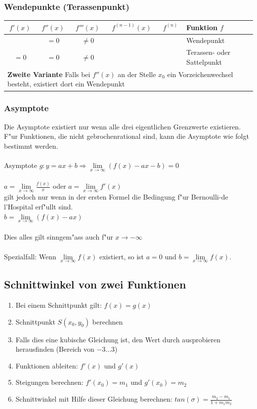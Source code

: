 \subsubsection{Wendepunkte (Terassenpunkt)}
\begin{tabular}{|c|c|c|c|c|l|}
	\hline $f'(x)$ & $f''(x)$ & $f'''(x)$ & $f^{(n-1)}(x)$ & $f^{(n)}$ & Funktion $f$ \\
	\hline\ & $= 0$ & $\neq 0$ & & & Wendepunkt\\
	\hline $= 0$ & $= 0$ & $\neq 0$ & & & Terassen- oder Sattelpunkt\\
	\hline\multicolumn{6}{|l|}{\textbf{Zweite Variante}  Falls bei $f''(x)$ an der Stelle $x_0$ ein Vorzeichenwechsel besteht, existiert dort ein Wendepunkt} \\\hline
\end{tabular}

\subsubsection{Asymptote}
	Die Asymptote existiert nur wenn alle drei eigentlichen Grenzwerte existieren.
	F"ur Funktionen, die nicht gebrochenrational sind, kann die Asymptote wie folgt bestimmt werden. \\
	\ \\ %
 	Asymptote  $g: y = ax + b \Rightarrow \lim\limits_{x \rightarrow \infty}(f(x) - ax - b) = 0$\\
	\ \\ %
	$a = \lim\limits_{x \rightarrow \infty} \frac{f(x)}{x} $ oder $a = \lim\limits_{x \rightarrow \infty} f'(x) \qquad $\\
	gilt jedoch nur wenn in der ersten Formel die Bedingung f"ur Bernoulli-de l'Hospital erf"ullt sind.\\
	$b = \lim\limits_{x \rightarrow \infty} (f(x) - ax) $\\
	\ \\ %
	Dies alles gilt sinngem"ass auch f"ur $x \rightarrow -\infty$\\
	\ \\ %
	Spezialfall: Wenn $\lim\limits_{x \rightarrow \infty} f(x)$ existiert, so ist $a = 0$ und $b = \lim\limits_{x \rightarrow \infty} f(x)$.
	
\subsection{Schnittwinkel von zwei Funktionen}
	\begin{enumerate}
		\item Bei einem Schnittpunkt gilt: $f(x)=g(x)$
		\item Schnittpunkt $S(x_0,y_0)$ berechnen
		\item Falls dies eine kubische Gleichung ist, den Wert durch ausprobieren herausfinden (Bereich von $-3 \dots 3$)
		\item Funktionen ableiten: $f'(x)$ und $g'(x)$
		\item Steigungen berechnen: $f'(x_0)=m_1$ und $g'(x_0)=m_2$
		\item Schnittwinkel mit Hilfe dieser Gleichung berechnen: $tan(\sigma)=\frac{m_2-m_1}{1+m_1m_2}$
	\end{enumerate}